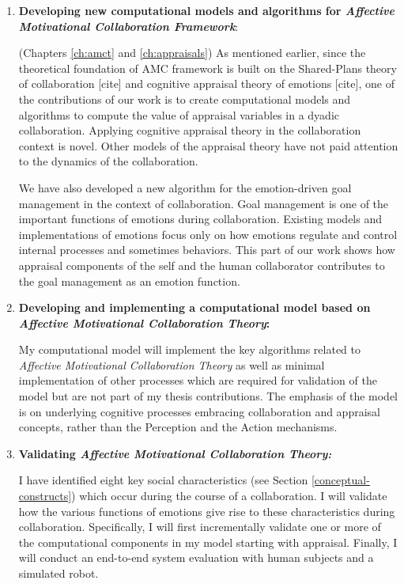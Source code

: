 \documentclass[12pt]{report}
\begin{document}
\begin{enumerate}
  \item \textbf{Developing new computational models and algorithms for
  \textit{Affective Motivational Collaboration Framework}}:
  
	(Chapters \ref{ch:amct} and \ref{ch:appraisals}) As mentioned earlier, since
	the theoretical foundation of AMC framework is built on the Shared-Plans theory
	of collaboration [cite] and cognitive appraisal theory of emotions [cite], one
	of the contributions of our work is to create computational models and
	algorithms to compute the value of appraisal variables in a dyadic
	collaboration. Applying cognitive appraisal theory in the collaboration context
	is novel. Other models of the appraisal theory have not paid attention to the
	dynamics of the collaboration.

  	We have also developed a new algorithm for the emotion-driven goal management
  	in the context of collaboration. Goal management is one of the important
  	functions of emotions during collaboration. Existing models and
  	implementations of emotions focus only on how emotions regulate and control
  	internal processes and sometimes behaviors. This part of our work shows how
  	appraisal components of the self and the human collaborator contributes to
  	the goal management as an emotion function.
  
  \item \textbf{Developing and implementing a computational model based on
  \textit{Affective Motivational Collaboration Theory}:}

  My computational model will implement the key algorithms related to
  \textit{Affective Motivational Collaboration Theory} as well as minimal
  implementation of other processes which are required for validation of the
  model but are not part of my thesis contributions. The emphasis of the model
  is on underlying cognitive processes embracing collaboration and appraisal
  concepts, rather than the Perception and the Action mechanisms.

  \item \textbf{Validating \textit{Affective Motivational Collaboration
  Theory:}}

  I have identified eight key social characteristics (see Section
  \ref{conceptual-constructs}) which occur during the course of a collaboration.
  I will validate how the various functions of emotions give rise to these
  characteristics during collaboration. Specifically, I will first incrementally
  validate one or more of the computational components in my model starting with
  appraisal. Finally, I will conduct an end-to-end system evaluation with human
  subjects and a simulated robot.
  
\end{enumerate}
\end{document}
